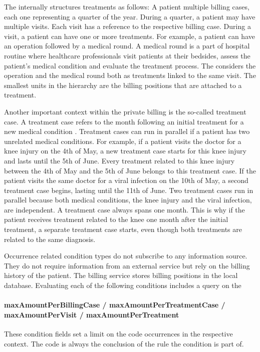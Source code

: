 The \AVS internally structures treatments as follows:
A patient multiple billing cases, each one representing a quarter of the year.
During a quarter, a patient may have multiple visits.
Each visit has a reference to the respective billing case.
During a visit, a patient can have one or more treatments.
For example, a patient can have an operation followed by a medical round.
A medical round is a part of hospital routine where healthcare professionals visit patients at their bedsides,
assess the patient's medical condition and evaluate the treatment process.
The \AVS considers the operation and the medical round both as treatments linked to the same visit.
The smallest units in the hierarchy are the billing positions that are attached to a treatment.

Another important context within the private billing is the so-called treatment case.
A treatment case refers to the month following an initial treatment for a new medical condition \cite{bruck1998kommentar}.
Treatment cases can run in parallel if a patient has two unrelated medical conditions.
For example, if a patient visits the doctor for a knee injury on the 4th of May, a new treatment case starts for this knee injury and lasts until the 5th of June.
Every treatment related to this knee injury between the 4th of May and the 5th of June belongs to this treatment case.
If the patient visits the same doctor for a viral infection on the 10th of May, a second treatment case begins, lasting until the 11th of June.
Two treatment cases run in parallel because both medical conditions, the knee injury and the viral infection, are independent.
A treatment case always spans one month.
This is why if the patient receives treatment related to the knee one month after the initial treatment, a separate treatment case starts, even though both treatments are related to the same diagnosis.

Occurrence related condition types do not subscribe to any information source.
They do not require information from an external service but rely on the billing history of the patient.
The billing service stores billing positions in the local database.
Evaluating each of the following conditions includes a query on the

\paragraph{maxAmountPerBillingCase / maxAmountPerTreatmentCase / maxAmountPerVisit / maxAmountPerTreatment}
These condition fields set a limit on the code occurrences in the respective context.
The code is always the conclusion of the rule the condition is part of.


